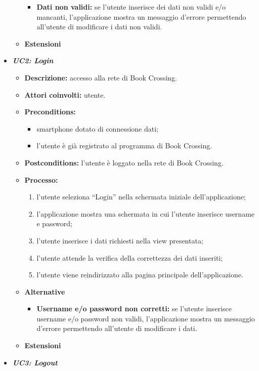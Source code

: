 \begin{itemize}
\begin{itemize}
\begin{itemize}
			\item \textbf{Dati non validi:} se l'utente inserisce dei dati non validi e/o mancanti, l'applicazione mostra un messaggio d'errore permettendo all'utente di modificare i dati non validi.
		\end{itemize}
		\item \textbf{Estensioni}
	\end{itemize}
	\item \textbf{\textit{UC2: Login}}
	\begin{itemize}
		\item \textbf{Descrizione:} accesso alla rete di Book Crossing.
		\item \textbf{Attori coinvolti:} utente. 
		\item \textbf{Preconditions:} 
		\begin{itemize}
			\item smartphone dotato di connessione dati;
			\item l’utente è già registrato al programma di Book Crossing.
		\end{itemize}
		\item \textbf{Postconditions:} l’utente è loggato nella rete di Book Crossing.
		\item \textbf{Processo:}
		\begin{enumerate}
			\item l’utente seleziona “Login” nella schermata iniziale dell’applicazione;
			\item l’applicazione mostra una schermata in cui l'utente inserisce username e password;
			\item l’utente inserisce i dati richiesti nella view presentata;
			\item l'utente attende la verifica della correttezza dei dati inseriti;
			\item l’utente viene reindirizzato alla pagina principale dell’applicazione.
		\end{enumerate}
		\item \textbf{Alternative}
		\begin{itemize}
			\item \textbf{Username e/o password non corretti:}  se l'utente inserisce username e/o password non validi, l'applicazione mostra un messaggio d'errore permettendo all'utente di modificare i dati.
		\end{itemize}
		\item \textbf{Estensioni}
	\end{itemize}
		\item \textbf{\textit{UC3: Logout}}

\end{itemize}
